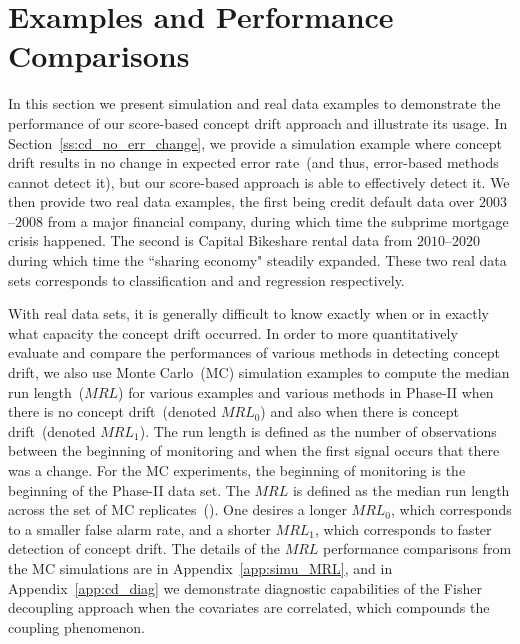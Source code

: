 \documentclass[twoside,11pt]{article}
\begin{document}
\section{Examples and Performance Comparisons}
\label{s:real_data}
In this section we present simulation and real data examples to demonstrate the performance of our score-based concept drift approach and illustrate its usage. In Section~\ref{ss:cd_no_err_change}, we provide a simulation example where concept drift results in no change in expected error rate~(and thus, error-based methods cannot detect it), but our score-based approach is able to effectively detect it. We then provide two real data examples, the first being credit default data over $2003$--$2008$ from a major financial company, during which time the subprime mortgage crisis happened. The second is Capital Bikeshare rental data from $2010$--$2020$ during which time the ``sharing economy" steadily expanded. These two real data sets corresponds to classification and and regression respectively.

With real data sets, it is generally difficult to know exactly when or in exactly what capacity the concept drift occurred. In order to more quantitatively evaluate and compare the performances of various methods in detecting concept drift, we also use Monte Carlo~(MC) simulation examples to compute the median run length~($MRL$) for various examples and various methods in Phase-II when there is no concept drift~(denoted $MRL_0$) and also when there is concept drift~(denoted $MRL_1$). The run length is defined as the number of observations between the beginning of monitoring and when the first signal occurs that there was a change. For the MC experiments, the beginning of monitoring is the beginning of the Phase-II data set. The $MRL$ is defined as the median run length across the set of MC replicates~(\cite{montgomery2007introduction}). One desires a longer $MRL_0$, which corresponds to a smaller false alarm rate, and a shorter $MRL_1$, which corresponds to faster detection of concept drift. The details of the $MRL$ performance comparisons from the MC simulations are in Appendix~\ref{app:simu_MRL}, and in Appendix~\ref{app:cd_diag} we demonstrate diagnostic capabilities of the Fisher decoupling approach when the covariates are correlated, which compounds the coupling phenomenon. 
\end{document}
